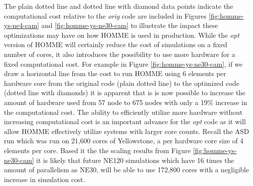 The plain dotted line and dotted line with diamond data points indicate the computational cost relative to the {\em orig} code are included in Figures \ref{fig:homme-ys-ne4-cam} and \ref{fig:homme-ys-ne30-cam} to illustrate the impact these optimizations may have on how HOMME is used in production.  While the {\em opt} version of HOMME will certainly reduce the cost of simulations on a fixed number of cores, it also introduces the possibility to use more hardware for a fixed computational cost.  For example in Figure \ref{fig:homme-ys-ne30-cam}, if we draw a horizontal line from the cost to run HOMME using 6 elements per hardware core from the original code (plain dotted line) to the optimized code (dotted line with diamonds) it is apparent that is is now possible to increase the amount of hardware used from 57 node to 675 nodes with only a 19\% increase in the computational cost.  The ability to efficiently utilize more hardware without increasing computational cost is an important advance for the {\em opt} code as it will allow HOMME effectively utilize systems with larger core counts.  Recall the ASD run which was run on 21,600 cores of Yellowstone, a per hardware core size of 4 elements per core.  Based it the the scaling results from Figure \ref{fig:homme-ys-ne30-cam} it is likely that future NE120 simulations which have 16 times the amount of parallelism as NE30, will be able to use 172,800 cores with a negligible increase in simulation cost.  


